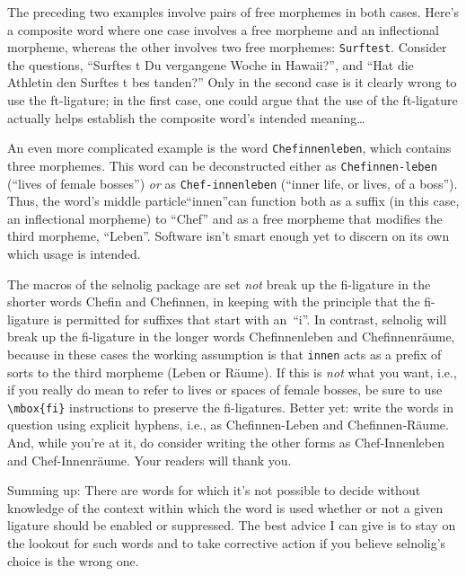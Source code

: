 \documentclass[11pt]{article}
\newcommand{\pkg}[1]{\textsf{#1}}
\newcommand{\opt}[1]{\texttt{#1}}
\begin{document}
The preceding two examples involve pairs of free morphemes in both cases. Here's a composite word where one case involves a free morpheme and an inflectional morpheme, whereas the other involves two free morphemes: \opt{Surftest}. Consider the questions, \enquote{Surftes\kern0pt t Du vergangene Woche in Hawaii?}, and \enquote{Hat die Athletin den Surf\breaklig tes\kern0pt t bes\kern0pt tanden?} Only in the second case is it clearly wrong to use the ft-ligature; in the first case, one could argue that the use of the ft-ligature actually helps establish the composite word's intended meaning\dots

An even more complicated example is the word \opt{Chefinnenleben}, which contains three morphemes. This word can be deconstructed either as \opt{Chefinnen-leben} (\enquote{lives of female bosses}) \emph{or} as \opt{Chef-innenleben} (\enquote{inner life, or lives, of a boss}). Thus, the word's middle particle\textemdash\enquote{innen}\textemdash can function both as a suffix (in this case, an inflectional morpheme) to \enquote{Chef} and as a free morpheme that modifies the third morpheme, \enquote{Leben}. Software isn't smart enough yet to discern on its own which usage is intended.

The macros of the \pkg{selnolig} package are set \emph{not} break up the fi-ligature in the shorter words Chefin and Chefinnen, in keeping with the principle that the fi-ligature is permitted for suffixes that start with an~\enquote{i}. In contrast, \pkg{selnolig} will break up the fi-ligature in the longer words Chefinnenleben and Chefinnenräume, because in these cases the working assumption is that \opt{innen} acts as a prefix of sorts to the third morpheme (Leben or Räume). If this is \emph{not} what you want, i.e., if you really do mean to refer to lives or spaces of female bosses, be sure to use \Verb+\mbox{fi}+ instructions to preserve the fi-ligatures. Better yet: write the words in question using explicit hyphens, i.e., as Chefinnen-Leben and Chefinnen-Räume. And, while you're at it, do consider writing the other forms as Chef-Innenleben and Chef-Innenräume. Your readers will thank you.

Summing up: There are words for which it's not possible to decide without knowledge of the context within which the word is used whether or not a given ligature should be enabled or suppressed. The best advice I can give is to stay on the lookout for such words and to take corrective action if you believe \pkg{selnolig}'s choice is the wrong one.
\end{document}
